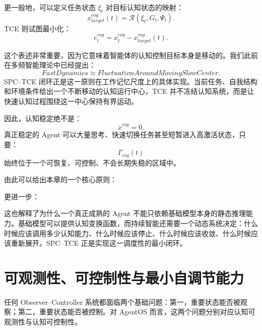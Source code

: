 更一般地，可以定义任务状态 $\xi_t$ 对目标认知状态的映射：
\begin{equation}
x_{target}^{cog}(t)
=
\mathcal R
\left(
\xi_t,
G_t,
\Psi_t
\right).
\end{equation}
TCE 则试图最小化：
\begin{equation}
e_t^{cog}
=
x_t^{cog}
-
x_{target}^{cog}(t).
\end{equation}

这个表述非常重要，因为它意味着智能体的认知控制目标本身是移动的。我们此前在多频智能理论中已经提出：
\begin{equation}
FastDynamics
\approx
FluctuationAroundMovingSlowCenter.
\end{equation}
SPC--TCE 闭环正是这一原则在工作记忆尺度上的具体实现。当前任务、自我结构和环境条件给出一个不断移动的认知运行中心，TCE 并不冻结认知系统，而是让快速认知过程围绕这一中心保持有界运动。

因此，认知稳定绝不是：
\begin{equation}
\dot{x}^{cog}=0.
\end{equation}
真正稳定的 Agent 可以大量思考、快速切换任务甚至短暂进入高激活状态，只要：
\begin{equation}
\Gamma_{cog}(t)
\end{equation}
始终位于一个可恢复、可控制、不会长期失稳的区域中。

由此可以给出本章的一个核心原则：
\begin{statementbox}
\centering
{}
\end{statementbox}

更进一步：
\begin{statementbox}
\centering
{}
\end{statementbox}

这也解释了为什么一个真正成熟的 Agent 不能只依赖基础模型本身的静态推理能力。基础模型可以提供认知变换函数，而持续智能还需要一个动态系统决定：什么时候应该调用多少认知能力、什么时候应该停止、什么时候应该收敛、什么时候应该重新展开。SPC--TCE 正是实现这一调度性的最小闭环。

\section{可观测性、可控制性与最小自调节能力}

任何 Observer--Controller 系统都面临两个基础问题：第一，重要状态能否被观察；第二，重要状态能否被控制。对 AgentOS 而言，这两个问题分别对应认知可观测性与认知可控制性。


